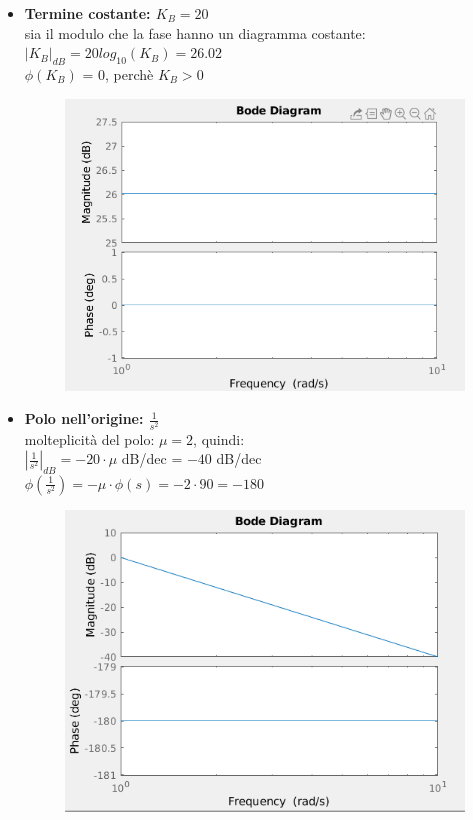 \documentclass[12pt,a4paper]{article}
\begin{document}
	\begin{itemize}
		\item \textbf{Termine costante: $K_B = 20$} \vspace{5px}\\
		sia il modulo che la fase hanno un diagramma costante:\\
		$|K_B|_{dB} = 20log_{10}(K_B) = 26.02$  \\
		$\phi(K_B)$ = 0\degree, perch\`e $K_B > 0$\\
		\begin{figure}[h!]
			\centering
			\includegraphics[scale=0.5]{./images/bode41.png}
		\end{figure}
		\newpage
		\item \textbf{Polo nell'origine: $\frac{1}{s^2}$}\\
		molteplicit\`a del polo: $\mu = 2$, quindi:\\
		$|\frac{1}{s^2}|_{dB} = -20\cdot\mu$ dB/dec = $-40$  dB/dec\\
		$\phi(\frac{1}{s^2}) = -\mu \cdot \phi(s) = -2 \cdot 90$\degree $= -180$\degree
		\begin{figure}[h!]
			\centering
			\includegraphics[scale=0.5]{./images/bode41_4.png}

\end{figure}
\end{itemize}
\end{document}
